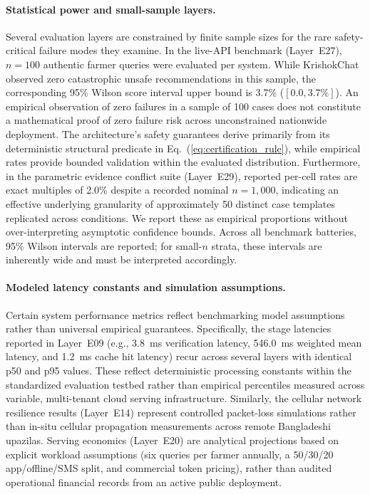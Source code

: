 \documentclass[a4paper,fleqn]{cas-dc}
\begin{document}
\paragraph{Statistical power and small-sample layers.}
Several evaluation layers are constrained by finite sample sizes for the rare safety-critical failure modes they examine. In the live-API benchmark (Layer~E27), $n=100$ authentic farmer queries were evaluated per system. While KrishokChat observed zero catastrophic unsafe recommendations in this sample, the corresponding 95\% Wilson score interval upper bound is 3.7\% ($[0.0, 3.7\%]$). An empirical observation of zero failures in a sample of 100 cases does not constitute a mathematical proof of zero failure risk across unconstrained nationwide deployment. The architecture's safety guarantees derive primarily from its deterministic structural predicate in Eq.~(\ref{eq:certification_rule}), while empirical rates provide bounded validation within the evaluated distribution. Furthermore, in the parametric evidence conflict suite (Layer~E29), reported per-cell rates are exact multiples of 2.0\% despite a recorded nominal $n=1{,}000$, indicating an effective underlying granularity of approximately 50 distinct case templates replicated across conditions. We report these as empirical proportions without over-interpreting asymptotic confidence bounds. Across all benchmark batteries, 95\% Wilson intervals are reported; for small-$n$ strata, these intervals are inherently wide and must be interpreted accordingly.

\paragraph{Modeled latency constants and simulation assumptions.}
Certain system performance metrics reflect benchmarking model assumptions rather than universal empirical guarantees. Specifically, the stage latencies reported in Layer~E09 (e.g., 3.8~ms verification latency, 546.0~ms weighted mean latency, and 1.2~ms cache hit latency) recur across several layers with identical p50 and p95 values. These reflect deterministic processing constants within the standardized evaluation testbed rather than empirical percentiles measured across variable, multi-tenant cloud serving infrastructure. Similarly, the cellular network resilience results (Layer~E14) represent controlled packet-loss simulations rather than in-situ cellular propagation measurements across remote Bangladeshi upazilas. Serving economics (Layer~E20) are analytical projections based on explicit workload assumptions (six queries per farmer annually, a 50/30/20 app/offline/SMS split, and commercial token pricing), rather than audited operational financial records from an active public deployment.
\end{document}
